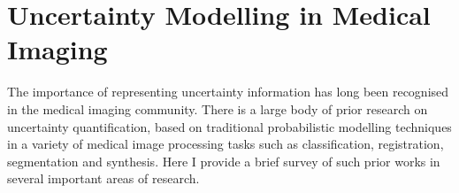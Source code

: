  
% 

 




%




\section{Uncertainty Modelling in Medical Imaging}
The importance of representing uncertainty information has long been recognised in the medical imaging community. There is a large body of prior research on uncertainty quantification, based on traditional probabilistic modelling techniques in a variety of medical image processing tasks such as classification, registration, segmentation and synthesis. Here I provide a brief survey of such prior works in several important areas of research. 
  
